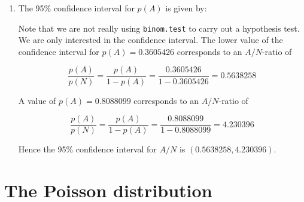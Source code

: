 \begin{enumerate}
\item\label{it:binomtest} The 95\% confidence interval for $p(A)$ is
  given by:


Note that we are not really using \texttt{binom.test} to carry out a
hypothesis test. We are only interested in the confidence interval.
The lower value of the confidence interval for $p(A)=0.3605426$
corresponds to an $A/N$-ratio of

\[
\frac{p(A)}{p(N)} = \frac{p(A)}{1-p(A)} =
\frac{0.3605426}{1-0.3605426} = 0.5638258
\]

A value of $p(A)=0.8088099$ corresponds to an $A/N$-ratio of

\[
\frac{p(A)}{p(N)} = \frac{p(A)}{1-p(A)} =
\frac{0.8088099}{1-0.8088099} = 4.230396
\]

Hence the 95\% confidence interval for $A/N$ is
$(0.5638258,4.230396)$.

\end{enumerate}
  
\section{The Poisson distribution}
\label{sec:sol-poisson}

